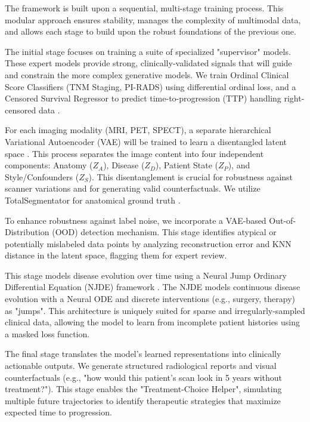 \documentclass[new,showhints]{nhrproposal}
\begin{document}
\ProjectDescription
The framework is built upon a sequential, multi-stage training process. This modular approach ensures stability, manages the complexity of multimodal data, and allows each stage to build upon the robust foundations of the previous one.

The initial stage focuses on training a suite of specialized "supervisor" models. These expert models provide strong, clinically-validated signals that will guide and constrain the more complex generative models. We train Ordinal Clinical Score Classifiers (TNM Staging, PI-RADS) using differential ordinal loss, and a Censored Survival Regressor to predict time-to-progression (TTP) handling right-censored data \cite{HeidenreichBastian2014}.

For each imaging modality (MRI, PET, SPECT), a separate hierarchical Variational Autoencoder (VAE) will be trained to learn a disentangled latent space \cite{PawlowskiCastro2020}. This process separates the image content into four independent components: Anatomy ($Z_A$), Disease ($Z_D$), Patient State ($Z_P$), and Style/Confounders ($Z_S$). This disentanglement is crucial for robustness against scanner variations and for generating valid counterfactuals. We utilize TotalSegmentator for anatomical ground truth \cite{Wasserthal_2023}.

To enhance robustness against label noise, we incorporate a VAE-based Out-of-Distribution (OOD) detection mechanism. This stage identifies atypical or potentially mislabeled data points by analyzing reconstruction error and KNN distance in the latent space, flagging them for expert review.

This stage models disease evolution over time using a Neural Jump Ordinary Differential Equation (NJDE) framework \cite{GwakSim2020}. The NJDE models continuous disease evolution with a Neural ODE and discrete interventions (e.g., surgery, therapy) as "jumps". This architecture is uniquely suited for sparse and irregularly-sampled clinical data, allowing the model to learn from incomplete patient histories using a masked loss function.

The final stage translates the model's learned representations into clinically actionable outputs. We generate structured radiological reports and visual counterfactuals (e.g., "how would this patient's scan look in 5 years without treatment?"). This stage enables the "Treatment-Choice Helper", simulating multiple future trajectories to identify therapeutic strategies that maximize expected time to progression.
\end{document}
